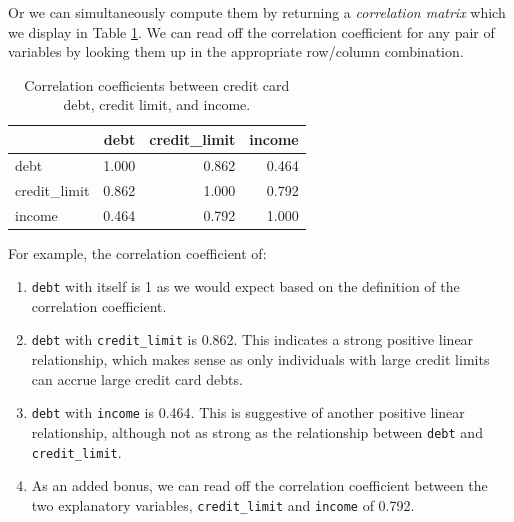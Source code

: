 \documentclass[12pt, krantz2,]{krantz}
\makeatletter
\newenvironment{Shaded}{\begin{snugshade}}{\end{snugshade}}
\newcommand{\KeywordTok}[1]{\textcolor[rgb]{0.27,0.27,0.27}{\textbf{#1}}}
\newcommand{\NormalTok}[1]{#1}
\newcommand{\OperatorTok}[1]{\textcolor[rgb]{0.43,0.43,0.43}{\textbf{#1}}}
\newcommand{\StringTok}[1]{\textcolor[rgb]{0.5,0.5,0.5}{#1}}
\providecommand{\tightlist}{%
  \setlength{\itemsep}{0pt}\setlength{\parskip}{0pt}}
\newenvironment{kframe}{%
\medskip{}
\setlength{\fboxsep}{.8em}
 \def\at@end@of@kframe{}%
 \ifinner\ifhmode%
  \def\at@end@of@kframe{\end{minipage}}%
  \begin{minipage}{\columnwidth}%
 \fi\fi%
 \def\FrameCommand##1{\hskip\@totalleftmargin \hskip-\fboxsep
 \colorbox{shadecolor}{##1}\hskip-\fboxsep
     \hskip-\linewidth \hskip-\@totalleftmargin \hskip\columnwidth}%
 \MakeFramed {\advance\hsize-\width
   \@totalleftmargin\z@ \linewidth\hsize
   \@setminipage}}%
 {\par\unskip\endMakeFramed%
 \at@end@of@kframe}
\renewenvironment{Shaded}{\begin{kframe}}{\end{kframe}}
\makeatother
\begin{document}
\begin{Shaded}
\end{Shaded}

Or we can simultaneously compute them by returning a \emph{correlation matrix} which we display in Table \ref{tab:model3-correlation}. We can read off the correlation coefficient for any pair of variables by looking them up in the appropriate row/column combination.

\begin{Shaded}
\end{Shaded}

\begin{table}[H]

\caption{\label{tab:model3-correlation}Correlation coefficients between credit card debt, credit limit, and income.}
\centering
\fontsize{10}{12}\selectfont
\begin{tabular}{lrrr}
\toprule
  & debt & credit\_limit & income\\
\midrule
debt & 1.000 & 0.862 & 0.464\\
credit\_limit & 0.862 & 1.000 & 0.792\\
income & 0.464 & 0.792 & 1.000\\
\bottomrule
\end{tabular}
\end{table}

For example, the correlation coefficient of:

\begin{enumerate}
\def\labelenumi{\arabic{enumi}.}
\tightlist
\item
  \texttt{debt} with itself is 1 as we would expect based on the definition of the correlation coefficient.
\item
  \texttt{debt} with \texttt{credit\_limit} is 0.862. This indicates a strong positive linear relationship, which makes sense as only individuals with large credit limits can accrue large credit card debts.
\item
  \texttt{debt} with \texttt{income} is 0.464. This is suggestive of another positive linear relationship, although not as strong as the relationship between \texttt{debt} and \texttt{credit\_limit}.
\item
  As an added bonus, we can read off the correlation coefficient between the two explanatory variables, \texttt{credit\_limit} and \texttt{income} of 0.792.
\end{enumerate}
\end{document}
